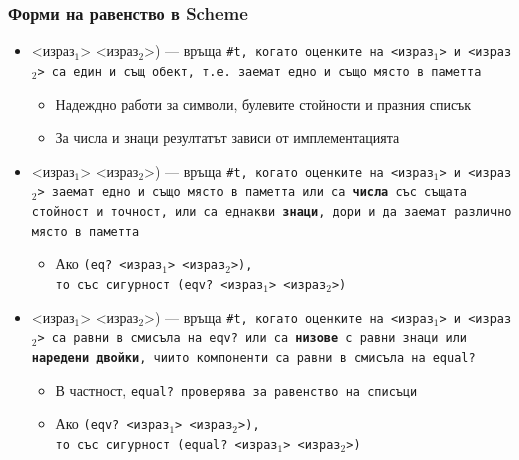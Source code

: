 \documentclass[alsotrans,beameroptions={aspectratio=169}]{beamerswitch}
\begin{document}
\begin{frame}
  \frametitle{Форми на равенство в Scheme}

  \begin{itemize}[<+->]
  \item {} <израз$_1$> <израз$_2$>\tta) --- връща \tt{\#t}, когато оценките на <израз$_1$> и <израз$_2$> са един и същ обект, т.е. заемат едно и също място в паметта
    \begin{itemize}
    \item Надеждно работи за символи, булевите стойности и празния списък
    \item За числа и знаци резултатът зависи от имплементацията
    \end{itemize}
  \item {} <израз$_1$> <израз$_2$>\tta) --- връща \tt{\#t}, когато оценките на <израз$_1$> и <израз$_2$> заемат едно и също място в паметта или са \textbf{числа} със същата стойност и точност, или са еднакви \textbf{знаци}, дори и да заемат различно място в паметта
    \begin{itemize}
    \item Ако \tt{(eq?} <израз$_1$> <израз$_2$>\tt),\\
      то със сигурност \tt{(eqv?} <израз$_1$> <израз$_2$>\tt)
    \end{itemize}
  \item {} <израз$_1$> <израз$_2$>\tta) --- връща \tt{\#t}, когато оценките на <израз$_1$> и <израз$_2$> са равни в смисъла на \tt{eqv?} или са \textbf{низове} с равни знаци или \textbf{наредени двойки}, чиито компоненти са равни в смисъла на \tt{equal?}
    \begin{itemize}
    \item В частност, \tt{equal?} проверява за равенство на списъци
    \item Ако \tt{(eqv?} <израз$_1$> <израз$_2$>\tt),\\
      то със сигурност \tt{(equal?} <израз$_1$> <израз$_2$>\tt)
    \end{itemize}
  \end{itemize}
\end{frame}
\end{document}

